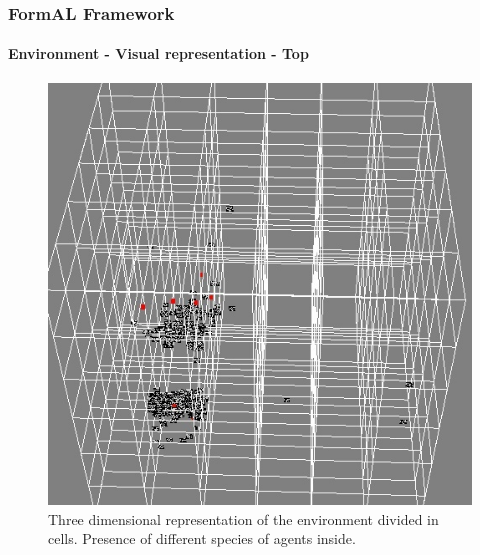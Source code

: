 \frame
{
	\frametitle{FormAL Framework}
	\framesubtitle{Environment - Visual representation - Top}

	\begin{figure}[H]
		\centering
		\includegraphics[scale=0.40]{../tex/images/cells-top}
		\caption{Three dimensional representation of the environment divided in cells. Presence of different species of agents inside.}
	\label{tab:3-d-environment-images-2}
	\end{figure}	
}

